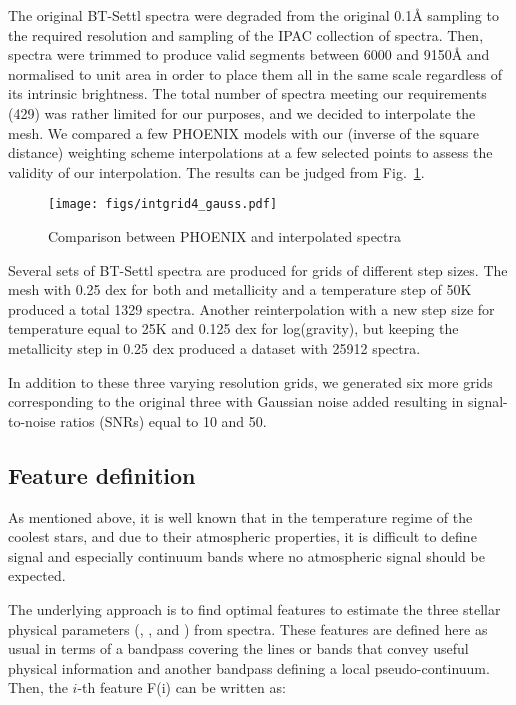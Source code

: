 The original BT-Settl spectra were degraded from the original 0.1{\AA}
sampling to the required resolution and sampling of the IPAC
collection of spectra.  Then, spectra were trimmed to produce valid
segments between 6000 and 9150{\AA} and normalised to unit area in
order to place them all in the same scale regardless of its intrinsic
brightness. The total number of spectra meeting our requirements (429)
was rather limited for our purposes, and we decided to interpolate the
mesh. We compared a few PHOENIX \cite{fuhrmeister2005phoenix} models
with our (inverse of the square distance) weighting scheme
interpolations at a few selected points to assess the validity of our
interpolation. The results can be judged from
Fig.~\ref{fig:comp_gen_inter}.


\begin {figure}
 \begin{center}
 \texttt{[image: figs/intgrid4\_gauss.pdf]}
 \caption{Comparison between PHOENIX and interpolated spectra}
 \label{fig:comp_gen_inter}
 \end{center}
\end {figure}


Several sets of BT-Settl spectra are produced for grids of different
step sizes. The mesh with 0.25 dex for both \logg and metallicity and
a temperature step of 50K produced a total 1329 spectra.  Another
reinterpolation with a new step size for temperature equal to 25K and
0.125 dex for log(gravity), but keeping the metallicity step in 0.25
dex produced a dataset with 25912 spectra.

In addition to these three varying resolution grids, we generated six
more grids corresponding to the original three with Gaussian noise
added resulting in signal-to-noise ratios (SNRs) equal to 10 and 50.

\subsection{Feature definition}
\label{subsec:FD}

As mentioned above, it is well known that in the temperature regime of
the coolest stars, and due to their atmospheric properties, it is
difficult to define signal and especially continuum bands where no
atmospheric signal should be expected.

The underlying approach is to find optimal features to estimate the
three stellar physical parameters (\teff, \logg, and \metal) from
spectra. These features are defined here as usual in terms of a
bandpass covering the lines or bands that convey useful physical
information and another bandpass defining a local
pseudo-continuum. Then, the $i$-th feature F(i) can be written as:

